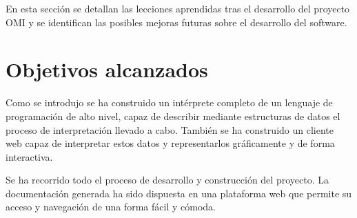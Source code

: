 

En esta sección se detallan las lecciones aprendidas tras el desarrollo del proyecto OMI y
se identifican las posibles mejoras futuras sobre el desarrollo del software.
\section{Objetivos alcanzados}
Como se introdujo se ha construido un intérprete completo de un lenguaje de programación de 
alto nivel, capaz de describir mediante estructuras de datos el proceso de interpretación llevado a cabo. También se 
ha construido un cliente web capaz de interpretar estos datos y representarlos gráficamente y de forma interactiva.

Se ha recorrido todo el proceso de desarrollo y construcción del proyecto. La documentación generada ha sido dispuesta 
en una plataforma web que permite su acceso y navegación de una forma fácil y cómoda. 

